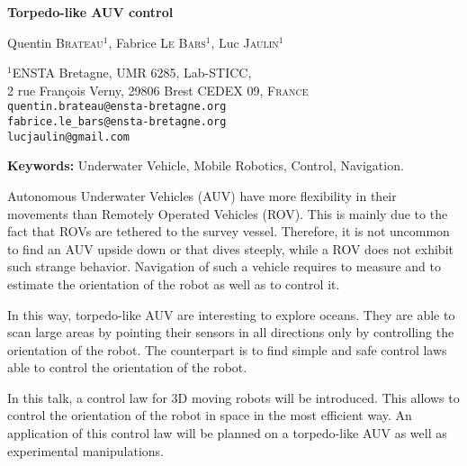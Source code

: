 \documentclass[14pt, a4paper]{article}
\begin{document}
	\begin{center}

		{\Large\bf Torpedo-like AUV control}

		\vspace*{0.8cm}

		{\large Quentin \textsc{Brateau}$^{1}$, Fabrice \textsc{Le Bars}$^{1}$, Luc \textsc{Jaulin}$^{1}$}

		\bigskip

		{\small $^{1}$ENSTA Bretagne, UMR 6285, Lab-STICC, \\
		2 rue François Verny, 29806 Brest CEDEX 09, \textsc{France} \\
		\medskip
		\texttt{quentin.brateau@ensta-bretagne.org}\\
		\texttt{fabrice.le\_bars@ensta-bretagne.org}\\
		\texttt{lucjaulin@gmail.com}\\
		}

	\end{center}

	\bigskip

	{\noindent\bf Keywords:} Underwater Vehicle, Mobile Robotics, Control, Navigation.

	Autonomous Underwater Vehicles (AUV) have more flexibility in their movements than Remotely Operated Vehicles (ROV). This is mainly due to the fact that ROVs are tethered to the survey vessel. Therefore, it is not uncommon to find an AUV upside down or that dives steeply, while a ROV does not exhibit such strange behavior. Navigation of such a vehicle requires to measure and to estimate the orientation of the robot as well as to control it.

	In this way, torpedo-like AUV are interesting to explore oceans. They are able to scan large areas by pointing their sensors in all directions only by controlling the orientation of the robot. The counterpart is to find simple and safe control laws able to control the orientation of the robot.
	
	In this talk, a control law for 3D moving robots will be introduced. This allows to control the orientation of the robot in space in the most efficient way. An application of this control law will be planned on a torpedo-like AUV as well as experimental manipulations.

	\medskip
\end{document}
